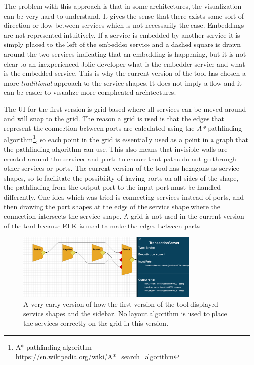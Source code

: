 The problem with this approach is that in some architectures, the visualization can be very hard to understand.
It gives the sense that there exists some sort of direction or flow between services which is not necessarily the case.
Embeddings are not represented intuitively. If a service is embedded by another service it is simply placed to the left of the embedder service and a dashed square is drawn around the two services indicating that an embedding is happening, but it 
is not clear to an inexperienced Jolie developer what is the embedder service and what is the embedded service.
This is why the current version of the tool has chosen a more \emph{traditional} approach to the service shapes. It does not imply a flow and it can be easier to visualize more complicated architectures.

The UI for the first version is grid-based where all services can be moved around and will snap to the grid.
The reason a grid is used is that the edges that represent the connection between ports are calculated using the \emph{A*} pathfinding algorithm\footnote{A* pathfinding algorithm - \url{https://en.wikipedia.org/wiki/A*_search_algorithm}}, so each point in the grid is essentially used as a point in a graph that the pathfinding algorithm can use.
This also means that invisible walls are created around the services and ports to ensure that paths do not go through other services or ports.
The current version of the tool has hexagons as service shapes, so to facilitate the possibility of having ports on all sides of the shape, the pathfinding from the output port to the input port must be handled differently.
One idea which was tried is connecting services instead of ports, and then drawing the port shapes at the edge of the service shape where the connection intersects the service shape.
A grid is not used in the current version of the tool because ELK is used to make the edges between ports.

\begin{figure}[t]
\center
\includegraphics[width=0.8\textwidth]{figures/old_ui.png}
\caption{A very early version of how the first version of the tool displayed service shapes and the sidebar. No layout algorithm is used to place the services correctly on the grid in this version.}
\label{figure:old_ui}
\end{figure}

